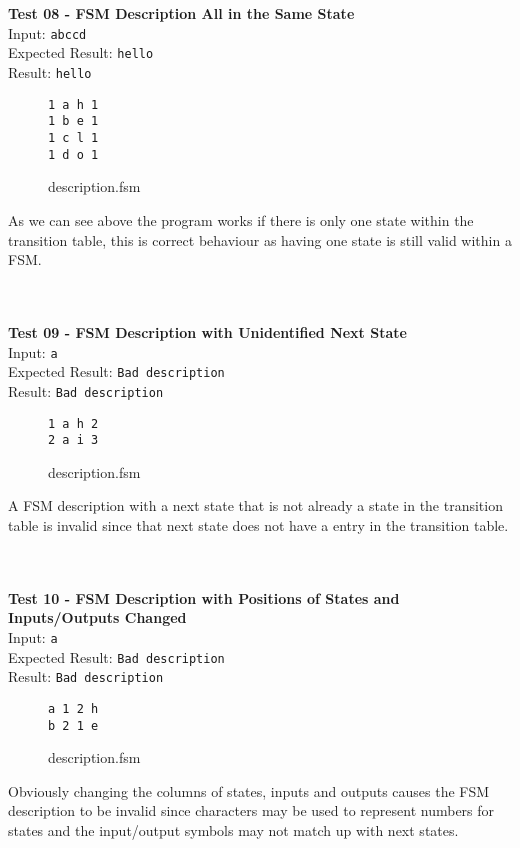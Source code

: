 \documentclass{article}
\begin{document}
\noindent \\ \\ \textbf{Test 08 - FSM Description All in the Same State} \\
\noindent Input: \verb+abccd+ \\
Expected Result: \verb+hello+ \\
Result: \verb+hello+ \\
\begin{figure}[H]
\center
\begin{BVerbatim}
1 a h 1
1 b e 1
1 c l 1
1 d o 1
\end{BVerbatim}
\caption{description.fsm}
\end{figure}
\noindent As we can see above the program works if there is only one state within the transition table, this is correct behaviour as having one state is still valid within a FSM.

\noindent \\ \\ \textbf{Test 09 - FSM Description with Unidentified Next State} \\
\noindent Input: \verb+a+ \\
Expected Result: \verb+Bad description+ \\
Result: \verb+Bad description+ \\
\begin{figure}[H]
\center
\begin{BVerbatim}
1 a h 2
2 a i 3
\end{BVerbatim}
\caption{description.fsm}
\end{figure}
\noindent A FSM description with a next state that is not already a state in the transition table is invalid since that next state does not have a entry in the transition table.

\noindent \\ \\ \textbf{Test 10 - FSM Description with Positions of States and Inputs/Outputs Changed} \\
\noindent Input: \verb+a+ \\
Expected Result: \verb+Bad description+ \\
Result: \verb+Bad description+ \\
\begin{figure}[H]
\center
\begin{BVerbatim}
a 1 2 h
b 2 1 e
\end{BVerbatim}
\caption{description.fsm}
\end{figure}
\noindent Obviously changing the columns of states, inputs and outputs causes the FSM description to be invalid since characters may be used to represent numbers for states and the input/output symbols may not match up with next states.
\end{document}
